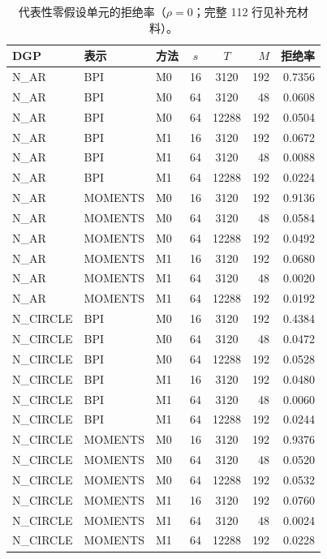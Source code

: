 \begin{table}[ht]
\centering
\caption{代表性零假设单元的拒绝率（$\rho=0$；完整 112 行见补充材料）。}\label{tab:h0-representative}
\begin{tabular}{lllccrr}
\toprule
DGP & 表示 & 方法 & $s$ & $T$ & $M$ & 拒绝率\\
\midrule
N\_AR & BPI & M0 & 16 & 3120 & 192 & 0.7356\\
N\_AR & BPI & M0 & 64 & 3120 & 48 & 0.0608\\
N\_AR & BPI & M0 & 64 & 12288 & 192 & 0.0504\\
N\_AR & BPI & M1 & 16 & 3120 & 192 & 0.0672\\
N\_AR & BPI & M1 & 64 & 3120 & 48 & 0.0088\\
N\_AR & BPI & M1 & 64 & 12288 & 192 & 0.0224\\
N\_AR & MOMENTS & M0 & 16 & 3120 & 192 & 0.9136\\
N\_AR & MOMENTS & M0 & 64 & 3120 & 48 & 0.0584\\
N\_AR & MOMENTS & M0 & 64 & 12288 & 192 & 0.0492\\
N\_AR & MOMENTS & M1 & 16 & 3120 & 192 & 0.0680\\
N\_AR & MOMENTS & M1 & 64 & 3120 & 48 & 0.0020\\
N\_AR & MOMENTS & M1 & 64 & 12288 & 192 & 0.0192\\
N\_CIRCLE & BPI & M0 & 16 & 3120 & 192 & 0.4384\\
N\_CIRCLE & BPI & M0 & 64 & 3120 & 48 & 0.0472\\
N\_CIRCLE & BPI & M0 & 64 & 12288 & 192 & 0.0528\\
N\_CIRCLE & BPI & M1 & 16 & 3120 & 192 & 0.0480\\
N\_CIRCLE & BPI & M1 & 64 & 3120 & 48 & 0.0060\\
N\_CIRCLE & BPI & M1 & 64 & 12288 & 192 & 0.0244\\
N\_CIRCLE & MOMENTS & M0 & 16 & 3120 & 192 & 0.9376\\
N\_CIRCLE & MOMENTS & M0 & 64 & 3120 & 48 & 0.0520\\
N\_CIRCLE & MOMENTS & M0 & 64 & 12288 & 192 & 0.0532\\
N\_CIRCLE & MOMENTS & M1 & 16 & 3120 & 192 & 0.0760\\
N\_CIRCLE & MOMENTS & M1 & 64 & 3120 & 48 & 0.0024\\
N\_CIRCLE & MOMENTS & M1 & 64 & 12288 & 192 & 0.0228\\
\bottomrule
\end{tabular}
\end{table}
